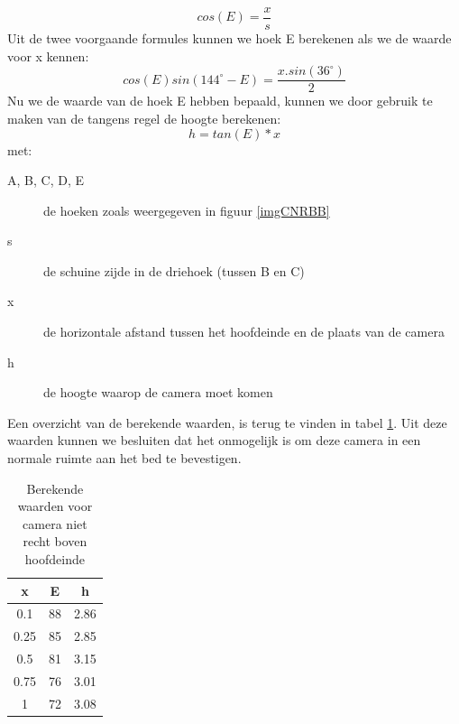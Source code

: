 \begin{displaymath}
cos(E) = \frac{x}{s}
\end{displaymath}
Uit de twee voorgaande formules kunnen we hoek E berekenen als we de waarde voor x kennen:
\begin{displaymath}
cos(E)sin(144^\circ-E) = \frac{x.sin(36^\circ)}{2}
\end{displaymath}
Nu we de waarde van de hoek E hebben bepaald, kunnen we door gebruik te maken van de tangens regel de hoogte berekenen:
\begin{displaymath}
h = tan(E)*x
\end{displaymath}
met:
\begin{description}
	\item [A, B, C, D, E] de hoeken zoals weergegeven in figuur \ref{imgCNRBB}
	\item[s] de schuine zijde in de driehoek (tussen B en C)
	\item[x] de horizontale afstand tussen het hoofdeinde en de plaats van de camera
	\item[h] de hoogte waarop de camera moet komen
\end{description}
Een overzicht van de berekende waarden, is terug te vinden in tabel \ref{refTabCNRBB}. Uit deze waarden kunnen we besluiten dat het onmogelijk is om deze camera in een normale ruimte aan het bed te bevestigen.
\begin{table}[hbp]
	\caption{Berekende waarden voor camera niet recht boven hoofdeinde}
	\begin{tabular}{|c|c|c|}
		\hline
		x & E & h \\ \hline
		0.1 & 88 & 2.86 \\ \hline
		0.25 & 85 & 2.85 \\ \hline
		0.5 & 81 & 3.15 \\ \hline
		0.75 & 76 & 3.01 \\ \hline
		1 &  72 & 3.08 \\
		\hline
	\end{tabular}
	\label{refTabCNRBB}
\end{table}

